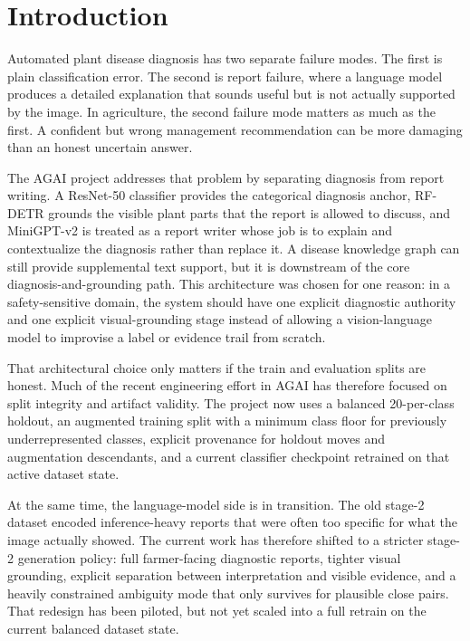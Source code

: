 \section{Introduction}

Automated plant disease diagnosis has two separate failure modes. The first is plain classification error. The second is report failure, where a language model produces a detailed explanation that sounds useful but is not actually supported by the image. In agriculture, the second failure mode matters as much as the first. A confident but wrong management recommendation can be more damaging than an honest uncertain answer.

The AGAI project addresses that problem by separating diagnosis from report writing. A ResNet-50 classifier provides the categorical diagnosis anchor, RF-DETR grounds the visible plant parts that the report is allowed to discuss, and MiniGPT-v2 is treated as a report writer whose job is to explain and contextualize the diagnosis rather than replace it. A disease knowledge graph can still provide supplemental text support, but it is downstream of the core diagnosis-and-grounding path. This architecture was chosen for one reason: in a safety-sensitive domain, the system should have one explicit diagnostic authority and one explicit visual-grounding stage instead of allowing a vision-language model to improvise a label or evidence trail from scratch.

That architectural choice only matters if the train and evaluation splits are honest. Much of the recent engineering effort in AGAI has therefore focused on split integrity and artifact validity. The project now uses a balanced 20-per-class holdout, an augmented training split with a minimum class floor for previously underrepresented classes, explicit provenance for holdout moves and augmentation descendants, and a current classifier checkpoint retrained on that active dataset state.

At the same time, the language-model side is in transition. The old stage-2 dataset encoded inference-heavy reports that were often too specific for what the image actually showed. The current work has therefore shifted to a stricter stage-2 generation policy: full farmer-facing diagnostic reports, tighter visual grounding, explicit separation between interpretation and visible evidence, and a heavily constrained ambiguity mode that only survives for plausible close pairs. That redesign has been piloted, but not yet scaled into a full retrain on the current balanced dataset state.

